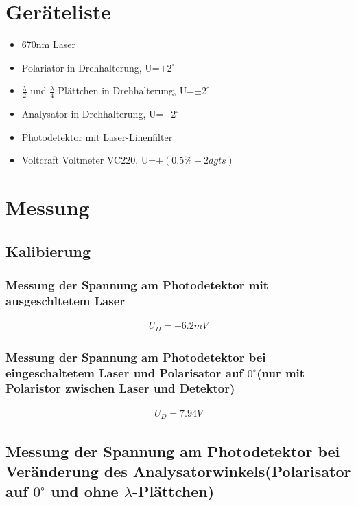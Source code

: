 \documentclass[a4paper]{article}
\begin{document}
\section{Geräteliste}
\begin{itemize}
  \item 670nm Laser
  \item Polariator in Drehhalterung, U=$\pm 2^\circ$
  \item $\frac{\lambda}{2}$ und $\frac{\lambda}{4}$ Plättchen in Drehhalterung, U=$\pm 2^\circ$
  \item Analysator in Drehhalterung, U=$\pm 2^\circ$
  \item Photodetektor mit Laser-Linenfilter
  \item Voltcraft Voltmeter VC220, U=$\pm(0.5\% + 2 dgts)$
\end{itemize}

\section{Messung}
\subsection{Kalibierung}
  \subsubsection{Messung der Spannung am Photodetektor mit ausgeschltetem Laser}
  \begin{align}
    U_D=-6.2mV
  \end{align}
  
  \subsubsection{Messung der Spannung am Photodetektor bei eingeschaltetem Laser und Polarisator auf $0^\circ$(nur mit Polaristor zwischen Laser und Detektor)}
  \begin{align}
    U_D=7.94V
  \end{align}
\newpage
  \subsection{Messung der Spannung am Photodetektor bei Veränderung des Analysatorwinkels(Polarisator auf $0^\circ$ und ohne $\lambda$-Plättchen)}
\end{document}

